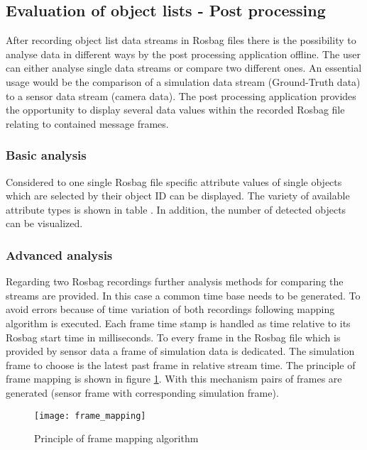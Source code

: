 \subsection{Evaluation of object lists - Post processing}

After recording object list data streams in Rosbag files there is the possibility to analyse data in different ways by the post processing application offline. The user can either analyse single data streams or compare two different ones. An essential usage would be the comparison of a simulation data stream (Ground-Truth data) to a sensor data stream (camera data). The post processing application provides the opportunity to display several data values within the recorded Rosbag file relating to contained message frames.

\subsubsection{Basic analysis}

Considered to one single Rosbag file specific attribute values of single objects which are selected by their object ID can be displayed. The variety of available attribute types is shown in table 
. In addition, the number of detected objects can be visualized. 

\subsubsection{Advanced analysis}

Regarding two Rosbag recordings further analysis methods for comparing the streams are provided. In this case a common time base needs to be generated. To avoid errors because of time variation of both recordings following mapping algorithm is executed. Each frame time stamp is handled as time relative to its Rosbag start time in milliseconds. To every frame in the Rosbag file which is provided by sensor data a frame of simulation data is dedicated. The simulation frame to choose is the latest past frame in relative stream time. The principle of frame mapping is shown in figure \ref{fig:frame_mapping}. With this mechanism pairs of frames are generated (sensor frame with corresponding simulation frame).

\begin{figure}[thpb]
	\centering
	\texttt{[image: frame\_mapping]}
	\caption{Principle of frame mapping algorithm}
	\label{fig:frame_mapping}
\end{figure}

